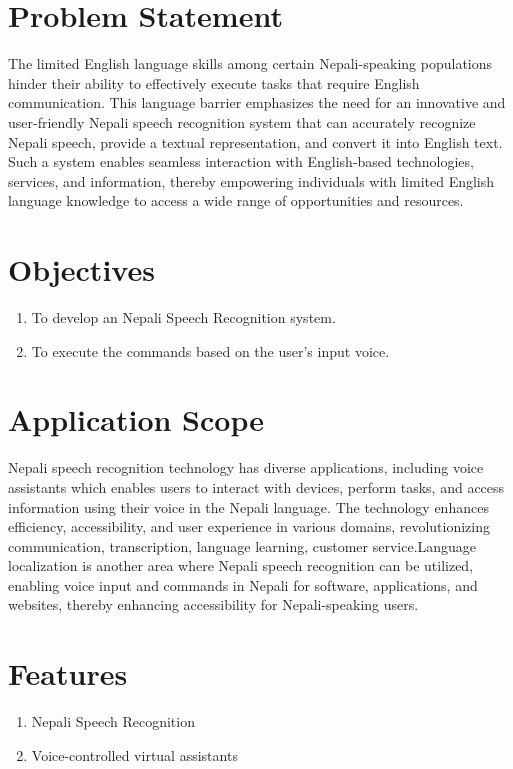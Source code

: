   
\section{Problem Statement}
The limited English language skills among certain Nepali-speaking populations hinder their ability to effectively execute tasks that require English communication. This language barrier emphasizes the need for an innovative and user-friendly Nepali speech recognition system that can accurately recognize Nepali speech, provide a textual representation, and convert it into English text. Such a system enables seamless interaction with English-based technologies, services, and information, thereby empowering individuals with limited English language knowledge to access a wide range of opportunities and resources.


\section{Objectives}
\begin{enumerate}[label=\roman*]
\item To develop an Nepali Speech Recognition system.
\item To execute the commands based on the user's input voice.
\end{enumerate}
	

   

\section{Application Scope}
Nepali speech recognition technology has diverse applications, including voice assistants which enables users to interact with devices, perform tasks, and access information using their voice in the Nepali language. The technology enhances efficiency, accessibility, and user experience in various domains, revolutionizing communication, transcription, language learning, customer service.Language localization is another area where Nepali speech recognition can be utilized, enabling voice input and commands in Nepali for software, applications, and websites, thereby enhancing accessibility for Nepali-speaking users.

\section{Features}
\begin{enumerate}
	\item Nepali Speech Recognition
	\item  Voice-controlled virtual assistants
\end{enumerate}
